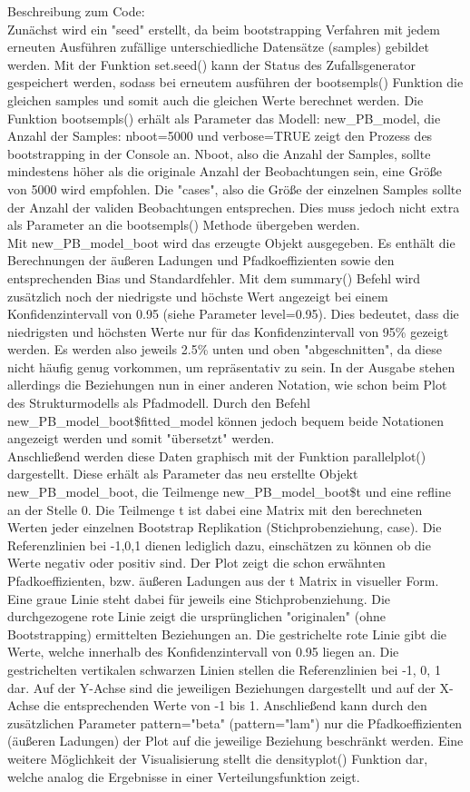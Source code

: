 \documentclass{article}\usepackage[]{graphicx}\usepackage[]{color}
\begin{document}
Beschreibung zum Code:\\
Zunächst wird ein "seed" erstellt, da beim bootstrapping Verfahren mit jedem erneuten Ausführen zufällige unterschiedliche Datensätze (samples) gebildet werden. Mit der Funktion set.seed() kann der Status des Zufallsgenerator gespeichert werden, sodass bei erneutem ausführen der bootsempls() Funktion die gleichen samples und somit auch die gleichen Werte berechnet werden. Die Funktion bootsempls() erhält als Parameter das Modell: new\_PB\_model, die Anzahl der Samples: nboot=5000 und verbose=TRUE zeigt den Prozess des bootstrapping in der Console an. Nboot, also die Anzahl der Samples, sollte mindestens höher als die originale Anzahl der Beobachtungen sein, eine Größe von 5000 wird empfohlen. Die "cases", also die Größe der einzelnen Samples sollte der Anzahl der validen Beobachtungen entsprechen. Dies muss jedoch nicht extra als Parameter an die bootsempls() Methode übergeben werden.\\
Mit new\_PB\_model\_boot wird das erzeugte Objekt ausgegeben. Es enthält die Berechnungen der äußeren Ladungen und Pfadkoeffizienten sowie den entsprechenden Bias und Standardfehler. Mit dem summary() Befehl wird zusätzlich noch der niedrigste und höchste Wert angezeigt bei einem Konfidenzintervall von 0.95 (siehe Parameter level=0.95). Dies bedeutet, dass die niedrigsten und höchsten Werte nur für das Konfidenzintervall von 95\% gezeigt werden. Es werden also jeweils 2.5\% unten und oben "abgeschnitten", da diese nicht häufig genug vorkommen, um repräsentativ zu sein. In der Ausgabe stehen allerdings die Beziehungen nun in einer anderen Notation, wie schon beim Plot des Strukturmodells als Pfadmodell. Durch den Befehl new\_PB\_model\_boot\$fitted\_model können jedoch bequem beide Notationen angezeigt werden und somit "übersetzt" werden.\\
Anschließend werden diese Daten graphisch mit der Funktion parallelplot() dargestellt. Diese erhält als Parameter das neu erstellte Objekt new\_PB\_model\_boot, die Teilmenge new\_PB\_model\_boot\$t und eine refline an der Stelle 0. Die Teilmenge t ist dabei eine Matrix mit den berechneten Werten jeder einzelnen Bootstrap Replikation (Stichprobenziehung, case). Die Referenzlinien bei -1,0,1 dienen lediglich dazu, einschätzen zu können ob die Werte negativ oder positiv sind. Der Plot zeigt die schon erwähnten Pfadkoeffizienten, bzw. äußeren Ladungen aus der t Matrix in visueller Form. Eine graue Linie steht dabei für jeweils eine Stichprobenziehung. Die durchgezogene rote Linie zeigt die ursprünglichen "originalen" (ohne Bootstrapping) ermittelten Beziehungen an. Die gestrichelte rote Linie gibt die Werte, welche innerhalb des Konfidenzintervall von 0.95 liegen an. Die gestrichelten vertikalen schwarzen Linien stellen die Referenzlinien bei -1, 0, 1 dar. Auf der Y-Achse sind die jeweiligen Beziehungen dargestellt und auf der X-Achse die entsprechenden Werte von -1 bis 1. Anschließend kann durch den zusätzlichen Parameter pattern="beta" (pattern="lam") nur die Pfadkoeffizienten (äußeren Ladungen) der Plot auf die jeweilige Beziehung beschränkt werden. Eine weitere Möglichkeit der Visualisierung stellt die densityplot() Funktion dar, welche analog die Ergebnisse in einer Verteilungsfunktion zeigt.\\
\end{document}
